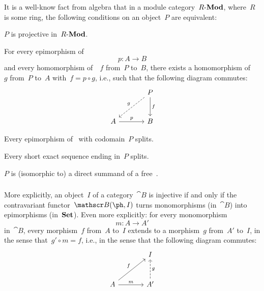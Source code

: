 \begin{remark}
	It is a well-know fact from algebra that in a module category~$R\text{-}\mathbf{Mod}$, where~$R$ is some ring, the following conditions on an object~$P$ are equivalent:
	\begin{equivalenceslist}

		\item
			$P$ is projective in~$R\text{-}\mathbf{Mod}$.

		\item
			For every epimorphism of~
			\[
				p \colon A \to B
			\]
			and every homomorphism of~~$f$ from~$P$ to~$B$, there exists a homomorphism of~~$g$ from~$P$ to~$A$ with~$f = p ∘ g$, i.e., such that the following diagram commutes:
			\[
				\begin{tikzcd}[sep = large]
					{}
					&
					P
					\arrow{d}[right]{f}
					\arrow[dashed]{dl}[above left]{g}
					\\
					A
					\arrow{r}[above]{p}
					&
					B
				\end{tikzcd}
			\]

		\item
			Every epimorphism of~ with codomain~$P$ splits.

		\item
			Every short exact sequence ending in~$P$ splits.

		\item
			$P$ is (isomorphic to) a direct summand of a free~.

	\end{equivalenceslist}
\end{remark}



\subsubsection{}

More explicitly, an object~$I$ of a category~$\cat{B}$ is injective if and only if the contravariant functor~$\cat{B}(\ph, I)$ turns monomorphisms (in~$\cat{B}$) into epimorphisms (in~$\mathbf{Set}$).
Even more explicitly:
for every monomorphism
\[
	m \colon A \to A'
\]
in~$\cat{B}$, every morphism~$f$ from~$A$ to~$I$ extends to a morphism~$g$ from~$A'$ to~$I$, in the sense that~$g' ∘ m = f$, i.e., in the sense that the following diagram commutes:
\[
	\begin{tikzcd}[sep = large]
		{}
		&
		I
		\\
		A
		\arrow{ur}[above left]{f}
		\arrow{r}[above]{m}
		&
		A'
		\arrow[dashed]{u}[right]{g}
	\end{tikzcd}
\]

